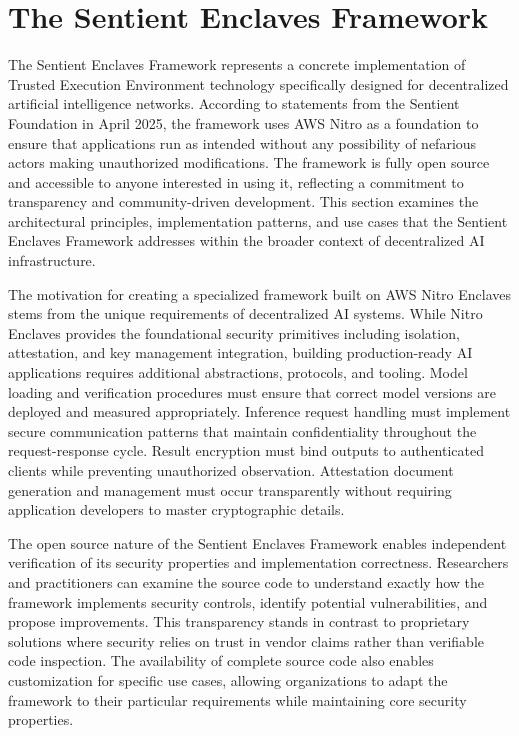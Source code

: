 \section{The Sentient Enclaves Framework}

The Sentient Enclaves Framework represents a concrete implementation of Trusted Execution Environment technology specifically designed for decentralized artificial intelligence networks. According to statements from the Sentient Foundation in April 2025, the framework uses AWS Nitro as a foundation to ensure that applications run as intended without any possibility of nefarious actors making unauthorized modifications. The framework is fully open source and accessible to anyone interested in using it, reflecting a commitment to transparency and community-driven development. This section examines the architectural principles, implementation patterns, and use cases that the Sentient Enclaves Framework addresses within the broader context of decentralized AI infrastructure.

The motivation for creating a specialized framework built on AWS Nitro Enclaves stems from the unique requirements of decentralized AI systems. While Nitro Enclaves provides the foundational security primitives including isolation, attestation, and key management integration, building production-ready AI applications requires additional abstractions, protocols, and tooling. Model loading and verification procedures must ensure that correct model versions are deployed and measured appropriately. Inference request handling must implement secure communication patterns that maintain confidentiality throughout the request-response cycle. Result encryption must bind outputs to authenticated clients while preventing unauthorized observation. Attestation document generation and management must occur transparently without requiring application developers to master cryptographic details.

The open source nature of the Sentient Enclaves Framework enables independent verification of its security properties and implementation correctness. Researchers and practitioners can examine the source code to understand exactly how the framework implements security controls, identify potential vulnerabilities, and propose improvements. This transparency stands in contrast to proprietary solutions where security relies on trust in vendor claims rather than verifiable code inspection. The availability of complete source code also enables customization for specific use cases, allowing organizations to adapt the framework to their particular requirements while maintaining core security properties.

